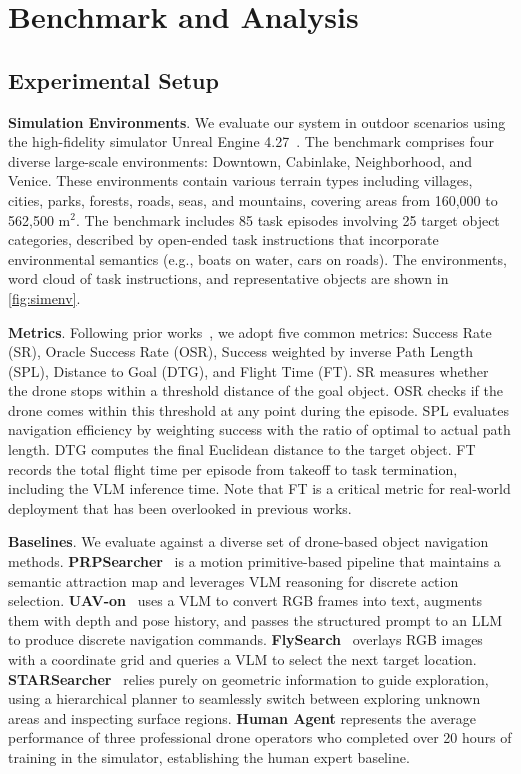 \section{Benchmark and Analysis}

\subsection{Experimental Setup}
\noindent \textbf{Simulation Environments}.
We evaluate our system in outdoor scenarios using the high-fidelity simulator Unreal Engine 4.27~\cite{ue}. The benchmark comprises four diverse large-scale environments: Downtown, Cabinlake, Neighborhood, and Venice. These environments contain various terrain types including villages, cities, parks, forests, roads, seas, and mountains, covering areas from 160,000 to 562,500 $\mathrm{m}^2$. 
The benchmark includes 85 task episodes involving 25 target object categories, described by open-ended task instructions that incorporate environmental semantics (e.g., boats on water, cars on roads).
The environments, word cloud of task instructions, and representative objects are shown in \fig\ref{fig:simenv}.


\noindent \textbf{Metrics}.
Following prior works~\cite{xiao2025uav,ji2025towards}, we adopt five common metrics: Success Rate (SR), Oracle Success Rate (OSR), Success weighted by inverse Path Length (SPL), Distance to Goal (DTG), and Flight Time (FT). SR measures whether the drone stops within a threshold distance of the goal object. OSR checks if the drone comes within this threshold at any point during the episode. SPL evaluates navigation efficiency by weighting success with the ratio of optimal to actual path length. DTG computes the final Euclidean distance to the target object. FT records the total flight time per episode from takeoff to task termination, including the VLM inference time. Note that FT is a critical metric for real-world deployment that has been overlooked in previous works.

\noindent \textbf{Baselines}. 
We evaluate \sysname against a diverse set of drone-based object navigation methods. 
\textbf{PRPSearcher}~\cite{ji2025towards} is a motion primitive-based pipeline that maintains a semantic attraction map and leverages VLM reasoning for discrete action selection.
\textbf{UAV-on}~\cite{xiao2025uav} uses a VLM to convert RGB frames into text, augments them with depth and pose history, and passes the structured prompt to an LLM to produce discrete navigation commands. \textbf{FlySearch}~\cite{pardyl2025flysearch} overlays RGB images with a coordinate grid and queries a VLM to select the next target location. \textbf{STARSearcher}~\cite{luo2024star} relies purely on geometric information to guide exploration, using a hierarchical planner to seamlessly switch between exploring unknown areas and inspecting surface regions. 
\textbf{Human Agent} represents the average performance of three professional drone operators who completed over 20 hours of training in the simulator, establishing the human expert baseline.


